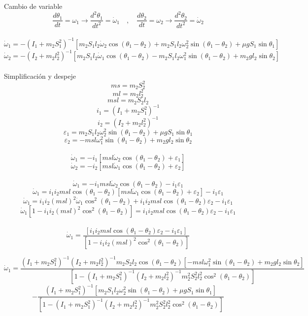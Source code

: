 \documentclass[10pt,a4papper]{article}
\begin{document}
\newpage
\Large
Cambio de variable\\
\[\frac{d\theta_1}{dt}=\omega_1\to\frac{d^2\theta_1}{dt^2}=\dot\omega_1\quad,\quad\frac{d\theta_2}{dt}=\omega_2\to\frac{d^2\theta_2}{dt^2}=\dot\omega_2\]\\

\[\dot\omega_1=-(I_1+m_2S_1^2)^{-1}\left[m_2S_1l_2\dot\omega_2\cos(\theta_1-\theta_2)+m_2S_1l_2\omega_2^2\sin(\theta_1-\theta_2)+\mu gS_1\sin\theta_1\right]\]
\[\dot\omega_2=-(I_2+m_2l_2^2)^{-1}\left[m_2S_1l_2\dot\omega_1\cos(\theta_1-\theta_2)-m_2S_1l_2\omega_1^2\sin(\theta_1-\theta_2)+m_2gl_2\sin\theta_2\right]\]\\


Simplificación y despeje
\[ms=m_2S_2^2\]
\[ml=m_2l_2^2\]
\[msl=m_2S_2l_2\]
\[i_1=(I_1+m_2S_1^2)^{-1}\]
\[i_2=(I_2+m_2l_2^2)^{-1}\]
\[\varepsilon_1=m_2S_1l_2\omega_2^2\sin(\theta_1-\theta_2)+\mu gS_1\sin\theta_1\]
\[\varepsilon_2=-msl\omega_1^2\sin(\theta_1-\theta_2)+m_2gl_2\sin\theta_2\]\\

\[\dot\omega_1=-i_1\left[msl\dot\omega_2\cos(\theta_1-\theta_2)+\varepsilon_1\right]\]
\[\dot\omega_2=-i_2\left[msl\dot\omega_1\cos(\theta_1-\theta_2)+\varepsilon_2\right]\]\\

\[\dot\omega_1=-i_1msl\dot\omega_2\cos(\theta_1-\theta_2)-i_1\varepsilon_1\]
\[\dot\omega_1=i_1i_2msl\cos(\theta_1-\theta_2)\left[msl\dot\omega_1\cos(\theta_1-\theta_2)+\varepsilon_2\right]-i_1\varepsilon_1\]
\[\dot\omega_1=i_1i_2(msl)^2\dot\omega_1\cos^2(\theta_1-\theta_2)+i_1i_2msl\cos(\theta_1-\theta_2)\varepsilon_2-i_1\varepsilon_1\]
\[\dot\omega_1[1-i_1i_2(msl)^2\cos^2(\theta_1-\theta_2)]=i_1i_2msl\cos(\theta_1-\theta_2)\varepsilon_2-i_1\varepsilon_1\]\\

\[\dot\omega_1=\frac{[i_1i_2msl\cos(\theta_1-\theta_2)\varepsilon_2-i_1\varepsilon_1]}{[1-i_1i_2(msl)^2\cos^2(\theta_1-\theta_2)]}\]


\newpage
\[\dot\omega_1=\frac{(I_1+m_2S_1^2)^{-1}(I_2+m_2l_2^2)^{-1}m_2S_2l_2\cos(\theta_1-\theta_2)[-msl\omega_1^2\sin(\theta_1-\theta_2)+m_2gl_2\sin\theta_2]}{[1-(I_1+m_2S_1^2)^{-1}(I_2+m_2l_2^2)^{-1}m_2^2S_2^2l_2^2\cos^2(\theta_1-\theta_2)]}\]
\[-\frac{(I_1+m_2S_1^2)^{-1}[m_2S_1l_2\omega_2^2\sin(\theta_1-\theta_2)+\mu gS_1\sin\theta_1]}{[1-(I_1+m_2S_1^2)^{-1}(I_2+m_2l_2^2)^{-1}m_2^2S_2^2l_2^2\cos^2(\theta_1-\theta_2)]}\]\\
\end{document}
